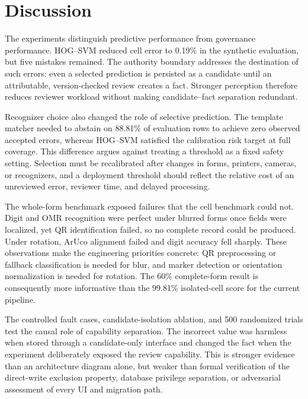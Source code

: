 \section{Discussion}
\label{sec:discussion}

The experiments distinguish predictive performance from governance performance. HOG--SVM reduced cell error to 0.19\% in the synthetic evaluation, but five mistakes remained. The authority boundary addresses the destination of such errors: even a selected prediction is persisted as a candidate until an attributable, version-checked review creates a fact. Stronger perception therefore reduces reviewer workload without making candidate--fact separation redundant.

Recognizer choice also changed the role of selective prediction. The template matcher needed to abstain on 88.81\% of evaluation rows to achieve zero observed accepted errors, whereas HOG--SVM satisfied the calibration risk target at full coverage. This difference argues against treating a threshold as a fixed safety setting. Selection must be recalibrated after changes in forms, printers, cameras, or recognizers, and a deployment threshold should reflect the relative cost of an unreviewed error, reviewer time, and delayed processing.

The whole-form benchmark exposed failures that the cell benchmark could not. Digit and OMR recognition were perfect under blurred forms once fields were localized, yet QR identification failed, so no complete record could be produced. Under rotation, ArUco alignment failed and digit accuracy fell sharply. These observations make the engineering priorities concrete: QR preprocessing or fallback classification is needed for blur, and marker detection or orientation normalization is needed for rotation. The 60\% complete-form result is consequently more informative than the 99.81\% isolated-cell score for the current pipeline.

The controlled fault cases, candidate-isolation ablation, and 500 randomized trials test the causal role of capability separation. The incorrect value was harmless when stored through a candidate-only interface and changed the fact when the experiment deliberately exposed the review capability. This is stronger evidence than an architecture diagram alone, but weaker than formal verification of the direct-write exclusion property, database privilege separation, or adversarial assessment of every UI and migration path.

